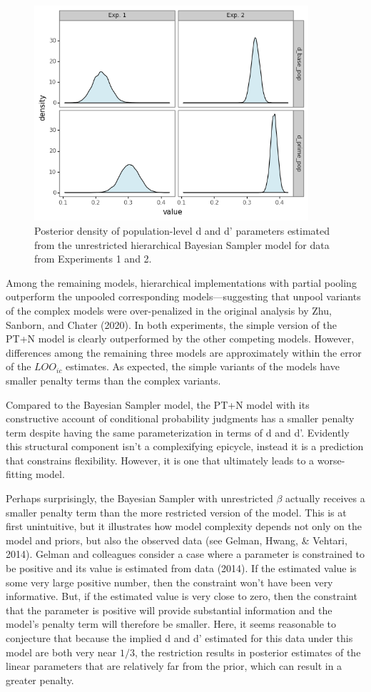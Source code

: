 \documentclass[
  english,
  man,floatsintext]{apa6}
\begin{document}
\begin{figure}[ht]
\centering
\includegraphics[width=4in]{plot_params.png}
\caption{Posterior density of population-level d and d' parameters estimated from the unrestricted hierarchical Bayesian Sampler model for data from Experiments 1 and 2.}
\end{figure}

Among the remaining models, hierarchical implementations with partial pooling outperform the unpooled corresponding models---suggesting that unpool variants of the complex models were over-penalized in the original analysis by Zhu, Sanborn, and Chater (2020). In both experiments, the simple version of the PT+N model is clearly outperformed by the other competing models. However, differences among the remaining three models are approximately within the error of the \(LOO_{ic}\) estimates. As expected, the simple variants of the models have smaller penalty terms than the complex variants.

Compared to the Bayesian Sampler model, the PT+N model with its constructive account of conditional probability judgments has a smaller penalty term despite having the same parameterization in terms of d and d'. Evidently this structural component isn't a complexifying epicycle, instead it is a prediction that constrains flexibility. However, it is one that ultimately leads to a worse-fitting model.

Perhaps surprisingly, the Bayesian Sampler with unrestricted \(\beta\) actually receives a smaller penalty term than the more restricted version of the model. This is at first unintuitive, but it illustrates how model complexity depends not only on the model and priors, but also the observed data (see Gelman, Hwang, \& Vehtari, 2014). Gelman and colleagues consider a case where a parameter is constrained to be positive and its value is estimated from data (2014). If the estimated value is some very large positive number, then the constraint won't have been very informative. But, if the estimated value is very close to zero, then the constraint that the parameter is positive will provide substantial information and the model's penalty term will therefore be smaller. Here, it seems reasonable to conjecture that because the implied d and d' estimated for this data under this model are both very near \(1/3\), the restriction results in posterior estimates of the linear parameters that are relatively far from the prior, which can result in a greater penalty.
\end{document}
